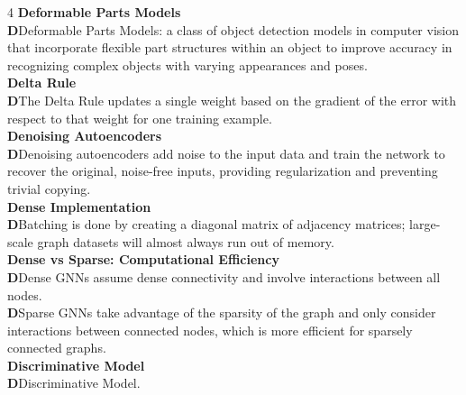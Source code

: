 \documentclass[8pt]{extarticle}
\newcommand{\dtag}{\textcolor{definitioncolor}{\tiny\textbf{D}}\;}
\begin{document}
\begin{multicols}{4}
\vspace{2pt}\textbf{Deformable Parts Models}\\
\dtag Deformable Parts Models: a class of object detection models in computer vision that incorporate flexible part structures within an object to improve accuracy in recognizing complex objects with varying appearances and poses.\\
\vspace{2pt}\textbf{Delta Rule}\\
\dtag The Delta Rule updates a single weight based on the gradient of the error with respect to that weight for one training example.\\
\vspace{2pt}\textbf{Denoising Autoencoders}\\
\dtag Denoising autoencoders add noise to the input data and train the network to recover the original, noise-free inputs, providing regularization and preventing trivial copying.\\
\vspace{2pt}\textbf{Dense Implementation}\\
\dtag Batching is done by creating a diagonal matrix of adjacency matrices; large-scale graph datasets will almost always run out of memory.\\
\vspace{2pt}\textbf{Dense vs Sparse: Computational Efficiency}\\
\dtag Dense GNNs assume dense connectivity and involve interactions between all nodes.\\
\dtag Sparse GNNs take advantage of the sparsity of the graph and only consider interactions between connected nodes, which is more efficient for sparsely connected graphs.\\
\vspace{2pt}\textbf{Discriminative Model}\\
\dtag Discriminative Model.\\


\end{multicols}
\end{document}
